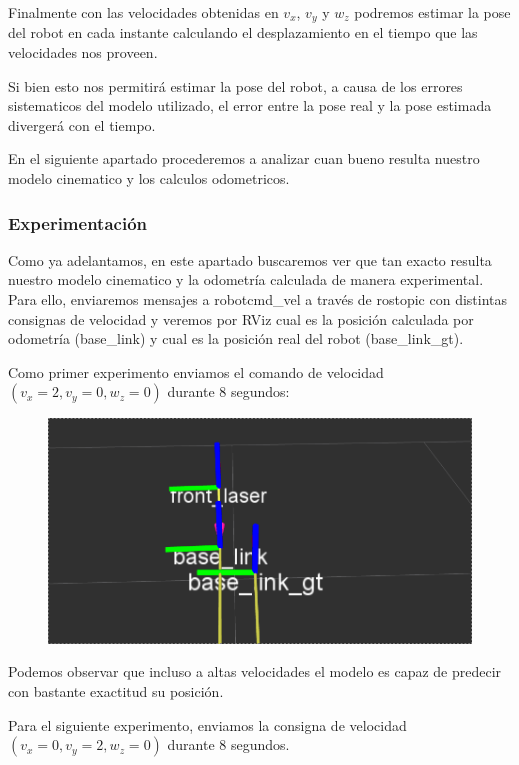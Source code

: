 Finalmente con las velocidades obtenidas en $v_x$, $v_y$ y $w_z$ podremos estimar la pose del robot en cada instante calculando el desplazamiento en el tiempo que las velocidades nos proveen.

Si bien esto nos permitirá estimar la pose del robot, a causa de los errores sistematicos del modelo utilizado, el error entre la pose real y la pose estimada divergerá con el tiempo. 


En el siguiente apartado procederemos a analizar cuan bueno resulta nuestro modelo cinematico y los calculos odometricos.

\subsubsection{Experimentación}

Como ya adelantamos, en este apartado buscaremos ver que tan exacto resulta nuestro modelo cinematico y la odometría calculada de manera experimental. Para ello, enviaremos mensajes a robot\/cmd\_vel a través de rostopic con distintas consignas de velocidad y veremos por RViz cual es la posición calculada por odometría (base\_link) y cual es la posición real del robot (base\_link\_gt). 


Como primer experimento enviamos el comando de velocidad $(v_x = 2, v_y=0, w_z=0)$ durante $8$ segundos:

\begin{figure}[!htb]
\includegraphics[width=\linewidth]{pruebasOdom/8segAdelante2.png}
\end{figure}


Podemos observar que incluso a altas velocidades el modelo es capaz de predecir con bastante exactitud su posición.


Para el siguiente experimento, enviamos la consigna de velocidad $(v_x = 0, v_y=2, w_z=0)$ durante $8$ segundos.

